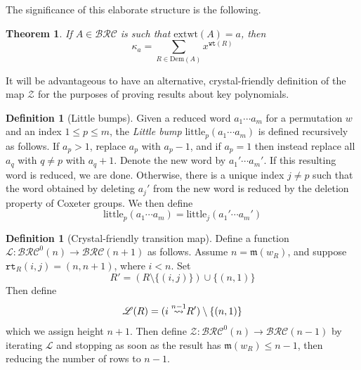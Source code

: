 \documentclass[a4paper,fleqn]{cas-sc}
\newtheorem{theorem}{Theorem}[section]
\theoremstyle{definition}
\newtheorem{definition}[lemma]{Definition}
\theoremstyle{remark}
\numberwithin{equation}{subsection}
\newcommand{\wof}[1]{w_{#1}}
\newcommand{\wtt}{\mathtt{wt}}
\newcommand{\rtt}{\mathtt{rt}}
\newcommand{\zeromap}{\mathcal{Z}}
\newcommand{\BRC}{\mathcal{BRC}}
\newcommand{\lzeromap}{\mathscr{Z}}
\newcommand{\lmap}{\mathscr{L}}
\newcommand{\ltb}{\mathrm{little}}
\newcommand{\maxd}{\mathfrak{m}}
\begin{document}
The significance of this elaborate structure is the following.
\begin{theorem} \label{theorem:keykey}
If $A\in\BRC$ is such that $\mathrm{extwt}(A) = a$, then
$$\kappa_a = \sum_{R\in\mathrm{Dem}(A)} x^{\wtt(R)}$$
\end{theorem}

It will be advantageous to have an alternative, crystal-friendly definition of the map $\zeromap$ for the purposes of proving results about key polynomials.

\begin{definition}[Little bumps]
  Given a reduced word $a_1\cdots a_m$ for a permutation $w$ and an index $1\leq p\leq m$, the \emph{Little bump} $\ltb_p(a_1\cdots a_m)$ is defined recursively as follows. If $a_p>1$, replace $a_p$ with $a_p-1$, and if $a_p=1$ then instead replace all $a_q$ with $q\neq p$ with $a_q+1$. Denote the new word by $a_1'\cdots a_m'$. If this resulting word is reduced, we are done. Otherwise, there is a unique index $j\neq p$ such that the word obtained by deleting $a_j'$ from the new word is reduced by the deletion property of Coxeter groups. We then define
  $$\ltb_p(a_1\cdots a_m) = \ltb_j(a_1'\cdots a_m')$$
\end{definition}

\begin{definition}[Crystal-friendly transition map]
Define a function $\lmap:\BRC^0(n)\to\BRC(n+1)$ as follows. Assume $n=\maxd(\wof{R})$, and suppose $\rtt_R(i, j) = (n, n + 1)$, where $i < n$. Set 
$$R'= (R\setminus \{(i, j)\})\cup \{(n,1)\}$$
Then define
$$\lmap(R) = (\ins{n-1}{i} R')\setminus\{(n, 1)\}$$
which we assign height $n+1$. Then define $\lzeromap:\BRC^0(n)\to \BRC(n-1)$ by iterating $\lmap$ and stopping as soon as the result has $\maxd(\wof{R})\leq n-1$, then reducing the number of rows to $n-1$.
\end{definition}
\end{document}
